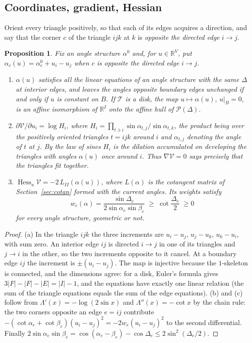\documentclass[11pt]{amsart}
\newtheorem{proposition}[theorem]{Proposition}
\theoremstyle{definition}
\theoremstyle{remark}
\newcommand{\R}{\mathbb{R}}
\newcommand{\cT}{\mathcal{T}}
\begin{document}
\subsection{Coordinates, gradient, Hessian}
Orient every triangle positively, so that each of its edges acquires a direction, and say that the corner $c$ of the triangle $ijk$ at $k$ is \emph{opposite the directed edge} $i\to j$.

\begin{proposition}\label{prop:hessian}
Fix an angle structure $\alpha^0$ and, for $u\in\R^V$, put $\alpha_c(u)=\alpha^0_c+u_i-u_j$ when $c$ is opposite the directed edge $i\to j$.
\begin{enumerate}[label=\textup{(\alph*)},leftmargin=*]
\item $\alpha(u)$ satisfies all the linear equations of an angle structure with the same $\Delta$ at interior edges, and leaves the angles opposite boundary edges unchanged if and only if $u$ is constant on $B$.
If $\cT$ is a disk, the map $u\mapsto\alpha(u)$, $u|_B=0$, is an affine isomorphism of $\R^I$ onto the affine hull of $\mathcal P(\Delta)$.
\item $\partial\mathcal V/\partial u_i=\log H_i$, where $H_i=\prod_{t\ni i}\sin\alpha_{t,j}/\sin\alpha_{t,k}$, the product being over the positively oriented triangles $t=ijk$ around $i$ and $\alpha_{t,j}$ denoting the angle of $t$ at $j$. By the law of sines $H_i$ is the dilation accumulated on developing the triangles with angles $\alpha(u)$ once
around $i$. Thus $\nabla\mathcal V=0$ says precisely that the triangles fit together.
\item $\operatorname{Hess}_u\mathcal V=-2\,L_{II}(\alpha(u))$, where $L(\alpha)$ is the cotangent matrix of Section~\ref{sec:cotan} formed with the current angles. Its weights satisfy
\begin{equation}\label{eq:wlower}
w_e(\alpha)=\frac{\sin\Delta_e}{2\sin\alpha_e\sin\beta_e}\;\ge\;\cot\frac{\Delta_e}2\;\ge0
\end{equation}
for \emph{every} angle structure, geometric or not.
\end{enumerate}
\end{proposition}

\begin{proof}
(a) In the triangle $ijk$ the three increments are $u_i-u_j$, $u_j-u_k$, $u_k-u_i$, with sum zero. An interior edge $ij$ is directed $i\to j$ in one of its triangles and $j\to i$ in the other, so the two increments opposite to it cancel. At a boundary edge $ij$ the increment is $\pm(u_i-u_j)$.
The map is injective because the $1$-skeleton is connected, and the dimensions agree: for a disk, Euler's formula gives $3|F|-|F|-|E|=|I|-1$, and the equations have exactly one linear relation (the sum of the triangle equations equals the sum of the edge equations).
(b) and (c) follow from $\Lambda'(x)=-\log(2\sin x)$ and $\Lambda''(x)=-\cot x$ by the chain rule: the two corners opposite an edge $e=ij$ contribute $-(\cot\alpha_e+\cot\beta_e)(u_i-u_j)^2=-2w_e(u_i-u_j)^2$ to the second differential.
Finally $2\sin\alpha_e\sin\beta_e=\cos(\alpha_e-\beta_e)-\cos\Delta_e\le2\sin^2(\Delta_e/2)$.
\end{proof}
\end{document}
